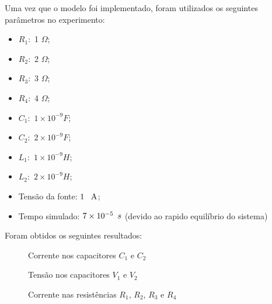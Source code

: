\documentclass[fleqn, 11pt]{article}
\begin{document}
Uma vez que o modelo foi implementado, foram utilizados os seguintes parâmetros no experimento:

\begin{itemize}
\item $R_1: $ 1 $\Omega$;
\item $R_2: $ 2 $\Omega$;
\item $R_3: $ 3 $\Omega$;
\item $R_4: $ 4 $\Omega$;

\item $C_1: $ $1 \times 10^{-9} F$;
\item $C_2: $ $2 \times 10^{-9} F$;

\item $L_1: $ $1 \times 10^{-9} H$;
\item $L_2: $ $2 \times 10^{-9} H$;

\item Tensão da fonte: $1 \text{\phantom{0} A}$; 
\item Tempo simulado: $7 \times 10^{-5} \text{\phantom{0}} s$ (devido ao rapido equilíbrio do sistema)
\end{itemize}

Foram obtidos os seguintes resultados:

\begin{figure}[H]
\label{figure:circuito_2}
   \caption{Corrente nos capacitores $C_1$ e $C_2$}
\end{figure}

\begin{figure}[H]
\label{figure:circuito_2}
   \caption{Tensão nos capacitores $V_1$ e $V_2$}
\end{figure}

\begin{figure}[H]
\label{figure:circuito_2}
   \caption{Corrente nas resistências $R_1$, $R_2$, $R_3$ e $R_4$}
\end{figure}
\end{document}
